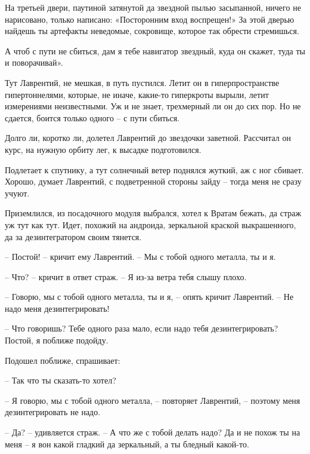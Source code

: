 \documentclass[ebook,oneside,final,openright]{memoir}
\begin{document}
\par
На третьей двери, паутиной затянутой да звездной пылью засыпанной, ничего не нарисовано, только написано: «Посторонним вход воспрещен!» За этой дверью найдешь ты артефакты неведомые, сокровище, которое так обрести стремишься.\par
\par
А чтоб с пути не сбиться, дам я тебе навигатор звездный, куда он скажет, туда ты и поворачивай».\par
\par
Тут Лаврентий, не мешкая, в путь пустился. Летит он в гиперпространстве гипертоннелями, которые, не иначе, какие-то гиперкроты вырыли, летит измерениями неизвестными. Уж и не знает, трехмерный ли он до сих пор. Но не сдается, боится только одного – с пути сбиться.\par
\par
Долго ли, коротко ли, долетел Лаврентий до звездочки заветной. Рассчитал он курс, на нужную орбиту лег, к высадке подготовился.\par
\par
Подлетает к спутнику, а тут солнечный ветер поднялся жуткий, аж с ног сбивает. Хорошо, думает Лаврентий, с подветренной стороны зайду – тогда меня не сразу учуют. \par
\par
 Приземлился, из посадочного модуля выбрался, хотел к Вратам бежать, да страж уж тут как тут. Идет, похожий на андроида, зеркальной краской выкрашенного, да за дезинтегратором своим тянется. \par
 \par
– Постой! – кричит ему Лаврентий. – Мы с тобой одного металла, ты и я. \par
– Что? – кричит в ответ страж. – Я из-за ветра тебя слышу плохо. \par
– Говорю, мы с тобой одного металла, ты и я, – опять кричит Лаврентий. – Не надо меня дезинтегрировать!\par
– Что говоришь? Тебе одного раза мало, если надо тебя дезинтегрировать? Постой, я поближе подойду. \par
Подошел поближе, спрашивает: \par
– Так что ты сказать-то хотел? \par
– Я говорю, мы с тобой одного металла, – повторяет Лаврентий, – поэтому меня дезинтегрировать не надо. \par
– Да? – удивляется страж. – А что же с тобой делать надо? Да и не похож ты на меня – я вон какой гладкий да зеркальный, а ты бледный какой-то. \par
\end{document}
